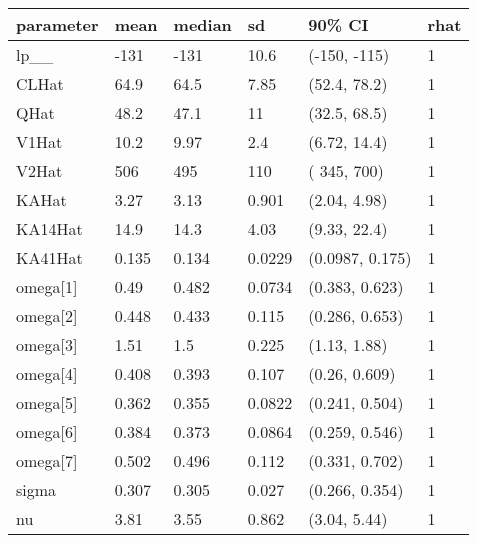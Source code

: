 
\begin{tabular}{l|l|l|l|l|l}
\hline
parameter & mean & median & sd & 90\% CI & rhat\\
\hline
lp\_\_ & -131 & -131 & 10.6 & (-150, -115) & 1\\
\hline
CLHat & 64.9 & 64.5 & 7.85 & (52.4, 78.2) & 1\\
\hline
QHat & 48.2 & 47.1 & 11 & (32.5, 68.5) & 1\\
\hline
V1Hat & 10.2 & 9.97 & 2.4 & (6.72, 14.4) & 1\\
\hline
V2Hat & 506 & 495 & 110 & ( 345,  700) & 1\\
\hline
KAHat & 3.27 & 3.13 & 0.901 & (2.04, 4.98) & 1\\
\hline
KA14Hat & 14.9 & 14.3 & 4.03 & (9.33, 22.4) & 1\\
\hline
KA41Hat & 0.135 & 0.134 & 0.0229 & (0.0987, 0.175) & 1\\
\hline
omega[1] & 0.49 & 0.482 & 0.0734 & (0.383, 0.623) & 1\\
\hline
omega[2] & 0.448 & 0.433 & 0.115 & (0.286, 0.653) & 1\\
\hline
omega[3] & 1.51 & 1.5 & 0.225 & (1.13, 1.88) & 1\\
\hline
omega[4] & 0.408 & 0.393 & 0.107 & (0.26, 0.609) & 1\\
\hline
omega[5] & 0.362 & 0.355 & 0.0822 & (0.241, 0.504) & 1\\
\hline
omega[6] & 0.384 & 0.373 & 0.0864 & (0.259, 0.546) & 1\\
\hline
omega[7] & 0.502 & 0.496 & 0.112 & (0.331, 0.702) & 1\\
\hline
sigma & 0.307 & 0.305 & 0.027 & (0.266, 0.354) & 1\\
\hline
nu & 3.81 & 3.55 & 0.862 & (3.04, 5.44) & 1\\
\hline
\end{tabular}
